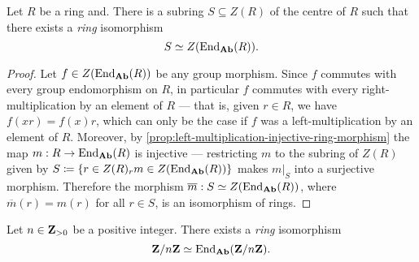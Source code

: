 %
\begin{proposition}
\label{prop:center-ring-iso-center-End(R)}
Let \(R\) be a ring and. There is a subring \(S \subseteq Z(R)\) of the
centre of \(R\) such that there exists a \emph{ring} isomorphism
\[
S \simeq Z(\operatorname{End}_{{\textbf{Ab}}}(R)).
\]
\end{proposition}
%

%
\begin{proof}
Let \(f \in Z(\operatorname{End}_{{\textbf{Ab}}}(R))\) be any group morphism. Since \(f\) commutes with
every group endomorphism on \(R\), in particular \(f\) commutes with every
right-multiplication by an element of \(R\) --- that is, given \(r \in R\), we
have \(f(x r) = f(x) r\), which can only be the case if \(f\) was a
left-multiplication by an element of \(R\). Moreover, by
\cref{prop:left-multiplication-injective-ring-morphism} the map
\(m: R \to \operatorname{End}_{{\textbf{Ab}}}(R)\) is injective --- restricting \(m\) to the subring of
\(Z(R)\) given by
\(S \coloneq \{r \in Z(R) \relax {}_rm \in Z(\operatorname{End}_{{\textbf{Ab}}}(R))\}\) makes \(m|_S\)
into a surjective morphism. Therefore the morphism
\(\overline{m}: S \simeq Z(\operatorname{End}_{{\textbf{Ab}}}(R))\), where \(\overline{m}(r) = m(r)\) for
all \(r \in S\), is an isomorphism of rings.
\end{proof}
%

%
\begin{corollary}
\label{cor:Z/nZ-iso-End(Z/nZ)}
Let \(n \in \mathbf{Z}_{> 0}\) be a positive integer. There exists a \emph{ring}
isomorphism
\[
\mathbf{Z}/n\mathbf{Z} \simeq \operatorname{End}_{{\textbf{Ab}}}(\mathbf{Z}/n\mathbf{Z}).
\]
\end{corollary}
%

